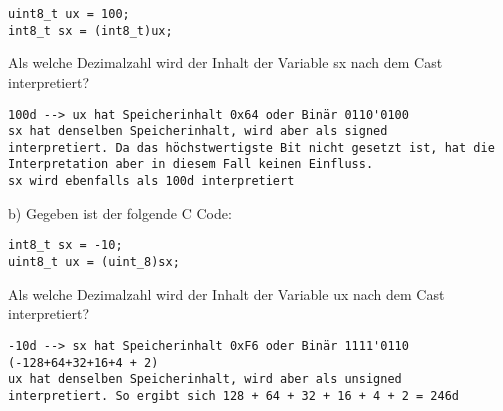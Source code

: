 \documentclass[10pt]{article}
\begin{document}
\begin{verbatim}
uint8_t ux = 100;
int8_t sx = (int8_t)ux;
\end{verbatim}

Als welche Dezimalzahl wird der Inhalt der Variable sx nach dem Cast interpretiert?

\begin{verbatim}
100d --> ux hat Speicherinhalt 0x64 oder Binär 0110'0100
sx hat denselben Speicherinhalt, wird aber als signed
interpretiert. Da das höchstwertigste Bit nicht gesetzt ist, hat die
Interpretation aber in diesem Fall keinen Einfluss.
sx wird ebenfalls als 100d interpretiert
\end{verbatim}

b) Gegeben ist der folgende C Code:

\begin{verbatim}
int8_t sx = -10;
uint8_t ux = (uint_8)sx;
\end{verbatim}

Als welche Dezimalzahl wird der Inhalt der Variable ux nach dem Cast interpretiert?

\begin{verbatim}
-10d --> sx hat Speicherinhalt 0xF6 oder Binär 1111'0110
(-128+64+32+16+4 + 2)
ux hat denselben Speicherinhalt, wird aber als unsigned
interpretiert. So ergibt sich 128 + 64 + 32 + 16 + 4 + 2 = 246d
\end{verbatim}
\end{document}
